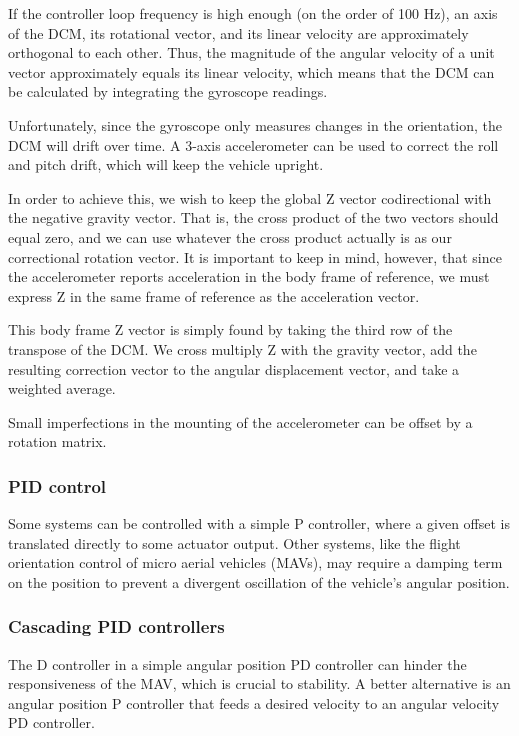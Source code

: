 \documentclass[12pt,letterpaper]{article}
\begin{document}
If the controller loop frequency is high enough (on the order of 100 Hz), an
axis of the DCM, its rotational vector, and its linear velocity are
approximately orthogonal to each other. Thus, the magnitude of the angular
velocity of a unit vector approximately equals its linear velocity, which means
that the DCM can be calculated by integrating the gyroscope readings.

Unfortunately, since the gyroscope only measures changes in the orientation,
the DCM will drift over time. A 3-axis accelerometer can be used to correct the
roll and pitch drift, which will keep the vehicle upright.

In order to achieve this, we wish to keep the global Z vector codirectional
with the negative gravity vector. That is, the cross product of the two vectors
should equal zero, and we can use whatever the cross product actually is as our
correctional rotation vector. It is important to keep in mind, however, that
since the accelerometer reports acceleration in the body frame of reference, we
must express Z in the same frame of reference as the acceleration vector.

This body frame Z vector is simply found by taking the third row of the
transpose of the DCM. We cross multiply Z with the gravity vector, add the
resulting correction vector to the angular displacement vector, and take a
weighted average.

Small imperfections in the mounting of the accelerometer can be offset by a
rotation matrix.


\subsubsection*{PID control}

Some systems can be controlled with a simple P controller, where a given offset
is translated directly to some actuator output. Other systems, like the flight
orientation control of micro aerial vehicles (MAVs), may require a damping term
on the position to prevent a divergent oscillation of the vehicle's angular
position.


\subsubsection*{Cascading PID controllers}

The D controller in a simple angular position PD controller can hinder the
responsiveness of the MAV, which is crucial to stability. A better alternative
is an angular position P controller that feeds a desired velocity to an angular
velocity PD controller.
\end{document}
